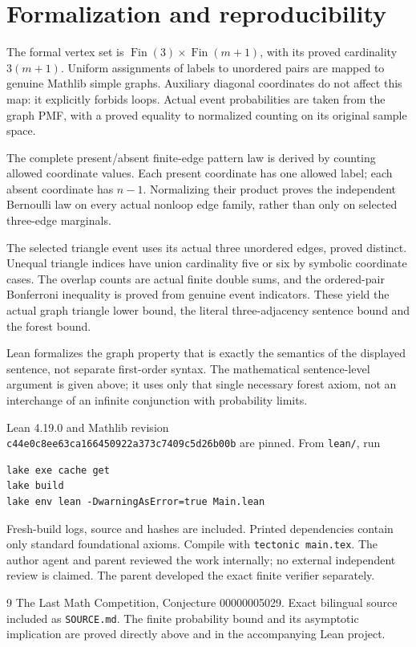\documentclass[11pt]{article}
\begin{document}
\newpage
\section*{Formalization and reproducibility}
The formal vertex set is
$\operatorname{Fin}(3)\times\operatorname{Fin}(m+1)$,
with its proved cardinality $3(m+1)$. Uniform assignments
of labels to unordered pairs are mapped to genuine
Mathlib simple graphs. Auxiliary diagonal coordinates
do not affect this map: it explicitly forbids loops.
Actual event probabilities are taken from the graph
PMF, with a proved equality to normalized counting
on its original sample space.

The complete present/absent finite-edge pattern law
is derived by counting allowed coordinate values.
Each present coordinate has one allowed label; each
absent coordinate has $n-1$. Normalizing their product
proves the independent Bernoulli law on every actual
nonloop edge family, rather than only on selected
three-edge marginals.

The selected triangle event uses its actual three
unordered edges, proved distinct. Unequal triangle
indices have union cardinality five or six by symbolic
coordinate cases. The overlap counts are actual finite
double sums, and the ordered-pair Bonferroni inequality
is proved from genuine event indicators. These yield
the actual graph triangle lower bound, the literal
three-adjacency sentence bound and the forest bound.

Lean formalizes the graph property that is exactly
the semantics of the displayed sentence, not separate
first-order syntax. The mathematical sentence-level
argument is given above; it uses only that single
necessary forest axiom, not an interchange of an
infinite conjunction with probability limits.

Lean 4.19.0 and Mathlib revision\\
\texttt{c44e0c8ee63ca166450922a373c7409c5d26b00b}
are pinned. From \texttt{lean/}, run
\begin{verbatim}
lake exe cache get
lake build
lake env lean -DwarningAsError=true Main.lean
\end{verbatim}
Fresh-build logs, source and hashes are included.
Printed dependencies contain only standard foundational
axioms. Compile with \texttt{tectonic main.tex}.
The author agent and parent reviewed the work internally;
no external independent review is claimed. The parent
developed the exact finite verifier separately.

\begin{thebibliography}{9}
 The Last Math Competition,
Conjecture 00000005029. Exact bilingual source included
as \texttt{SOURCE.md}. The finite probability bound
and its asymptotic implication are proved directly
above and in the accompanying Lean project.
\end{thebibliography}
\end{document}
